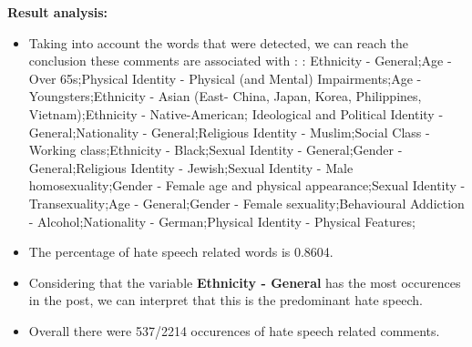 \documentclass[11pt]{article}
\begin{document}
\textbf{\Large Result analysis:}

\begin{itemize}\item Taking into account the words that were detected, we can reach the conclusion these comments are associated with : : Ethnicity - General;Age - Over 65s;Physical Identity - Physical (and Mental) Impairments;Age - Youngsters;Ethnicity - Asian (East- China, Japan, Korea, Philippines, Vietnam);Ethnicity - Native-American; Ideological and Political Identity - General;Nationality - General;Religious Identity - Muslim;Social Class - Working class;Ethnicity - Black;Sexual Identity - General;Gender - General;Religious Identity - Jewish;Sexual Identity - Male homosexuality;Gender - Female age and physical appearance;Sexual Identity - Transexuality;Age - General;Gender - Female sexuality;Behavioural Addiction - Alcohol;Nationality - German;Physical Identity - Physical Features;%

\item The percentage of hate speech related words is 0.8604.

\item Considering that the variable \textbf{Ethnicity - General} has the most occurences in the post, we can interpret that this is the predominant hate speech.

\item Overall there were 537/2214 occurences of hate speech related comments.\end{itemize}
\end{document}
